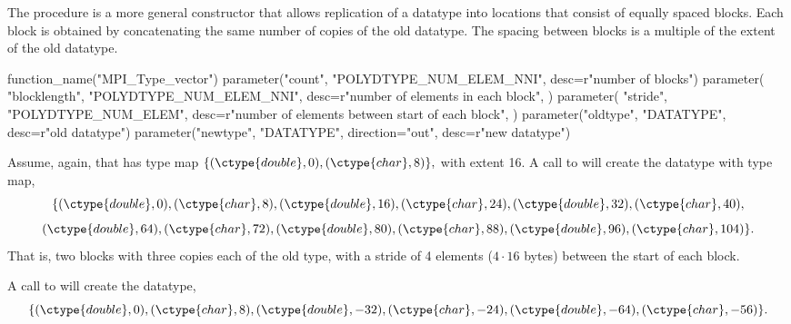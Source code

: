 The procedure
 is a more general constructor that
allows replication of a datatype
into locations that consist of equally spaced blocks.  Each block
is obtained by concatenating the same number of copies of the old datatype.
The spacing between blocks is a multiple of the extent of the old datatype.

\begin{mpi-binding}
    function_name("MPI_Type_vector")
    parameter("count", "POLYDTYPE_NUM_ELEM_NNI", desc=r"number of blocks")
    parameter(
        "blocklength",
        "POLYDTYPE_NUM_ELEM_NNI",
        desc=r"number of elements in each block",
    )
    parameter(
        "stride",
        "POLYDTYPE_NUM_ELEM",
        desc=r"number of elements between start of each block",
    )
    parameter("oldtype", "DATATYPE", desc=r"old datatype")
    parameter("newtype", "DATATYPE", direction="out", desc=r"new datatype")
\end{mpi-binding}

\begin{example}
\label{pt2pt-exT}
%
%
Assume, again, that  has type map
\(
\{ (\ctype{double}, 0), (\ctype{char}, 8) \} ,
\)
with extent 16.
A call to  will
create the datatype with type map,
\begin{displaymath}
\{
(\ctype{double}, 0), (\ctype{char}, 8), (\ctype{double}, 16), (\ctype{char},
24), (\ctype{double}, 32), (\ctype{char}, 40),
\end{displaymath}
\begin{displaymath}
(\ctype{double}, 64), (\ctype{char}, 72), (\ctype{double}, 80), (\ctype{char},
88), (\ctype{double}, 96), (\ctype{char}, 104)
\} .
\end{displaymath}
That is, two blocks with three copies each of the old
type, with a stride of 4 elements ($4 \cdot 16$ bytes) between the start of each block.
\end{example}

\begin{example}
\label{pt2pt-exTTT}
%
%
A call to  will create
the datatype,
\begin{displaymath}
\{
(\ctype{double}, 0), (\ctype{char}, 8), (\ctype{double}, -32), (\ctype{char},
-24), (\ctype{double}, -64), (\ctype{char}, -56)
\} .
\end{displaymath}
\end{example}

